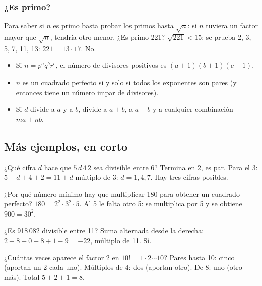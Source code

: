 \subsubsection{¿Es primo?}
Para saber si $n$ es primo basta probar los primos hasta $\sqrt n$: si $n$ tuviera un factor mayor que $\sqrt n$,
tendría otro menor. ¿Es primo 221? $\sqrt{221} < 15$; se prueba 2, 3, 5, 7, 11, 13: $221 = 13 \cdot 17$. No.

\begin{regla}
\begin{itemize}
  \item Si $n = p^a q^b r^c$, el número de divisores positivos es $(a + 1)(b + 1)(c + 1)$.
  \item $n$ es un cuadrado perfecto si y solo si todos los exponentes son pares (y entonces tiene un número impar de
  divisores).
  \item Si $d$ divide a $a$ y a $b$, divide a $a + b$, a $a - b$ y a cualquier combinación $ma + nb$.
\end{itemize}
\end{regla}

\subsection{Más ejemplos, en corto}
\begin{ejemplo}
¿Qué cifra $d$ hace que $5\,d\,4\,2$ sea divisible entre 6?
\solucion Termina en 2, es par. Para el 3: $5 + d + 4 + 2 = 11 + d$ múltiplo de 3: $d = 1, 4, 7$. Hay tres cifras posibles.
\end{ejemplo}

\begin{ejemplo}
¿Por qué número mínimo hay que multiplicar 180 para obtener un cuadrado perfecto?
\solucion $180 = 2^2 \cdot 3^2 \cdot 5$. Al 5 le falta otro 5: se multiplica por 5 y se obtiene $900 = 30^2$.
\end{ejemplo}

\begin{ejemplo}
¿Es 918\,082 divisible entre 11?
\solucion Suma alternada desde la derecha: $2 - 8 + 0 - 8 + 1 - 9 = -22$, múltiplo de 11. Sí.
\end{ejemplo}

\begin{ejemplo}
¿Cuántas veces aparece el factor 2 en $10! = 1 \cdot 2 \cdots 10$?
\solucion Pares hasta 10: cinco (aportan un 2 cada uno). Múltiplos de 4: dos (aportan otro). De 8: uno (otro más).
Total $5 + 2 + 1 = 8$.
\end{ejemplo}

